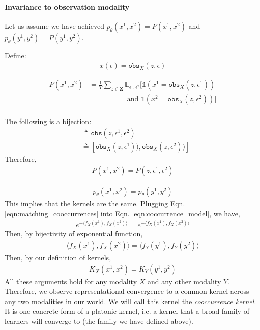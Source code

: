 \paragraph{Invariance to observation modality}
Let us assume we have achieved $p_{\theta}(x^1,x^2) = P(x^1, x^2)$ and $p_{\theta}(y^1,y^2) = P(y^1, y^2)$. 

Define:
\begin{align}
    x(\epsilon) = \texttt{obs}_X(z, \epsilon)
\end{align}


\begin{align}
    P(x^1,x^2) &= \frac{1}{T} \sum_{z \in \mathbf{Z}} \mathbb{E}_{\epsilon^1, \epsilon^2}[\mathds{1}(x^1 = \texttt{obs}_X(z, \epsilon^1)) \\ & \quad\quad\quad\quad\quad\text{ and } \mathds{1}(x^2 = \texttt{obs}_X(z, \epsilon^2))]\\
\end{align}

The following is a bijection:
\begin{align}
    [x^1,x^2] &\triangleq \texttt{obs}(z, \epsilon^1, \epsilon^2)\\
    &\triangleq [\texttt{obs}_X(z, \epsilon^1)), \texttt{obs}_X(z, \epsilon^2))]
\end{align}
Therefore, 
\begin{align}
    P(x^1,x^2) = P(z, \epsilon^1, \epsilon^2)
\end{align}

\begin{align}
    p_{\theta}(x^1,x^2) = p_{\theta}(y^1,y^2) \label{eqn:matching_cooccurrences}
\end{align}
This implies that the kernels are the same. Plugging Eqn. \ref{eqn:matching_cooccurrences} into Eqn. \ref{eqn:coccurrence_model}, we have,
\begin{align}
    e^{-\langle f_X(x^1), f_X(x^2) \rangle} = e^{-\langle f_X(x^1), f_X(x^2) \rangle}
\end{align}
Then, by bijectivity of exponential function,
\begin{align}
    \langle f_X(x^1), f_X(x^2) \rangle = \langle f_Y(y^1), f_Y(y^2) \rangle
\end{align}
Then, by our definition of kernels, 
\begin{align}
    K_X(x^1, x^2) = K_Y(y^1,y^2)
\end{align}
All these arguments hold for any modality $X$ and any other modality $Y$. Therefore, we observe representational convergence to a common kernel across any two modalities in our world. We will call this kernel the \textit{cooccurrence kernel}. It is one concrete form of a platonic kernel, i.e. a kernel that a broad family of learners will converge to (the family we have defined above).

